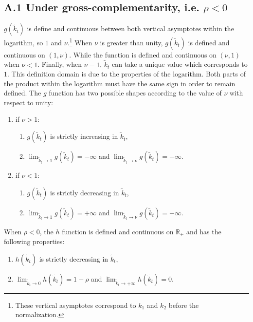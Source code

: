 \subsection*{A.1 Under gross-complementarity, i.e. $\rho < 0$}

$g(\tilde{k}_t)$ is define and continuous between both vertical asymptotes within the logarithm, so $1$ and $\nu$.\footnote{These vertical asymptotes correspond to $k_1$ and $k_2$ before the normalization.} When $\nu$ is greater than unity, $g(\tilde{k}_t)$ is defined and continuous on $\left(1, \nu\right)$. While the function is defined and continuous on $\left(\nu, 1\right)$ when $\nu < 1$. Finally, when $\nu = 1$, $\tilde{k}_t$ can take a unique value which corresponds to $1$. This definition domain is due to the properties of the logarithm. Both parts of the product within the logarithm must have the same sign in order to remain defined. The $g$ function has two possible shapes according to the value of $\nu$ with respect to unity:
	\begin{enumerate}
		\item if $\nu > 1$:
		\begin{enumerate}
			\item $g(\tilde{k}_t)$ is strictly increasing in $\tilde{k}_t$,%
			\item $\lim_{\tilde{k}_t\to 1} g(\tilde{k}_t) = -\infty$  and $\lim_{\tilde{k}_t\to \nu} g(\tilde{k}_t) = +\infty$.
		\end{enumerate}
		\item if $\nu < 1$:
		\begin{enumerate}
			\item $g(\tilde{k}_t)$ is strictly decreasing in $\tilde{k}_t$,%
			\item $\lim_{\tilde{k}_t\to 1} g(\tilde{k}_t) = +\infty$ and $\lim_{\tilde{k}_t\to \nu} g(\tilde{k}_t) = -\infty$.
		\end{enumerate}
	\end{enumerate}
When $\rho<0$, the $h$ function is defined and continuous on $\mathbb{R}_+$ and has the following properties:
	\begin{enumerate}
		\item $h(\tilde{k}_t)$ is strictly decreasing in $\tilde{k}_t$,%
		\item $\lim_{\tilde{k}_t\to 0} h(\tilde{k}_t) = 1-\rho$ and $\lim_{\tilde{k}_t\to +\infty} h(\tilde{k}_t) = 0$.
	\end{enumerate}

